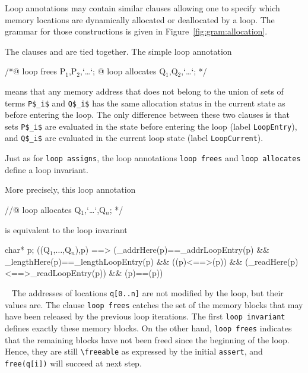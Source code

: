 Loop annotations may contain similar clauses allowing one to specify which 
memory locations 
are dynamically allocated or deallocated by a loop.
The grammar for those constructions is given in
 Figure~\ref{fig:gram:allocation}.

The clauses \Loop \allocates and \Loop \frees are tied together.
The simple loop annotation
\begin{listing-nonumber}
/*@ loop frees P$_1$,P$_2$,`\dots`;
  @ loop allocates Q$_1$,Q$_2$,`\dots`; */
\end{listing-nonumber}
means that any memory address that does not belong to the union of sets of 
terms
\lstinline|P$_i$| and  \lstinline|Q$_i$|
has the same allocation status in the current state as 
before entering the loop. 
The only difference between these two clauses is that sets 
\lstinline|P$_i$| are evaluated in the state before entering the loop
(label \lstinline|LoopEntry|), 
and \lstinline|Q$_i$| are evaluated in the current loop state 
(label \lstinline|LoopCurrent|).

Just as for \lstinline|loop assigns|, the loop annotations
\lstinline|loop frees| and \lstinline|loop allocates| define a loop invariant.

More precisely, this loop annotation
\begin{listing-nonumber}
//@ loop allocates Q$_1$,`\dots`,Q$_n$; */
\end{listing-nonumber}
is equivalent to the loop invariant
\begin{listing-nonumber}
\forall char* p; 
\separated(\union(Q$_1$,$\ldots$,Q$_n$),p) ==>
   (\base_addr{Here}(p)==\base_addr{LoopEntry}(p)
    && \block_length{Here}(p)==\block_length{LoopEntry}(p)
    && ((p)<==>(p))
    && (\valid_read{Here}(p)<==>\valid_read{LoopEntry}(p))
    && (p)==(p))
\end{listing-nonumber}

\begin{example}
~
The addresses of locations \lstinline|q[0..n]| are not modified by the loop,
but their values are.
The clause \lstinline|loop frees| catches the set of the memory blocks 
that may have been released by the previous loop iterations.
The first \lstinline|loop invariant| defines exactly these memory blocks.
On the other hand, \lstinline|loop frees| indicates that the remaining blocks
have not been freed since the beginning of the loop. Hence, they are still
\lstinline|\freeable| as expressed by the initial \lstinline|assert|, and
\lstinline|free(q[i])| will succeed at next step.
\end{example}

